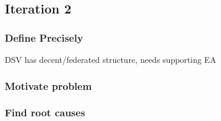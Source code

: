 

\subsection{Iteration 2}

\subsubsection*{Define Precisely}

DSV has decent/federated structure, needs supporting EA


\subsubsection*{Motivate problem}


\subsubsection*{Find root causes}
